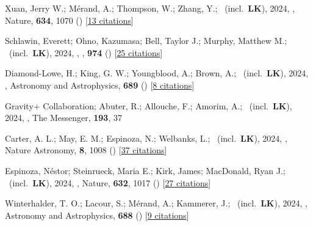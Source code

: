 \item[{\color{numcolor}\scriptsize124}] Xuan, Jerry W.; M{\'e}rand, A.; Thompson, W.; Zhang, Y.; \etal\ (incl.\ \textbf{LK}), 2024, , Nature, \textbf{634}, 1070 () [\href{https://ui.adsabs.harvard.edu/abs/2024Natur.634.1070X}{13 citations}]

\item[{\color{numcolor}\scriptsize123}] Schlawin, Everett; Ohno, Kazumasa; Bell, Taylor J.; Murphy, Matthew M.; \etal\ (incl.\ \textbf{LK}), 2024, , \apj, \textbf{974} () [\href{https://ui.adsabs.harvard.edu/abs/2024ApJ...974L..33S}{25 citations}]

\item[{\color{numcolor}\scriptsize122}] Diamond-Lowe, H.; King, G. W.; Youngblood, A.; Brown, A.; \etal\ (incl.\ \textbf{LK}), 2024, , Astronomy and Astrophysics, \textbf{689} () [\href{https://ui.adsabs.harvard.edu/abs/2024A&A...689A..48D}{8 citations}]

\item[{\color{numcolor}\scriptsize121}] Gravity+ Collaboration; Abuter, R.; Allouche, F.; Amorim, A.; \etal\ (incl.\ \textbf{LK}), 2024, , The Messenger, \textbf{193}, 37

\item[{\color{numcolor}\scriptsize120}] Carter, A. L.; May, E. M.; Espinoza, N.; Welbanks, L.; \etal\ (incl.\ \textbf{LK}), 2024, , Nature Astronomy, \textbf{8}, 1008 () [\href{https://ui.adsabs.harvard.edu/abs/2024NatAs...8.1008C}{37 citations}]

\item[{\color{numcolor}\scriptsize119}] Espinoza, N{\'e}stor; Steinrueck, Maria E.; Kirk, James; MacDonald, Ryan J.; \etal\ (incl.\ \textbf{LK}), 2024, , Nature, \textbf{632}, 1017 () [\href{https://ui.adsabs.harvard.edu/abs/2024Natur.632.1017E}{27 citations}]

\item[{\color{numcolor}\scriptsize118}] Winterhalder, T. O.; Lacour, S.; M{\'e}rand, A.; Kammerer, J.; \etal\ (incl.\ \textbf{LK}), 2024, , Astronomy and Astrophysics, \textbf{688} () [\href{https://ui.adsabs.harvard.edu/abs/2024A&A...688A..44W}{9 citations}]

